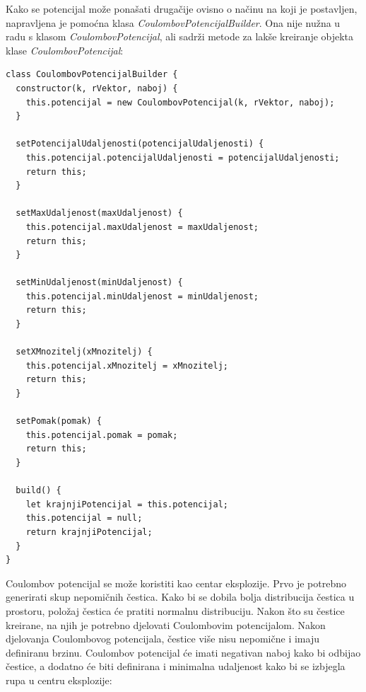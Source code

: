 \documentclass{foi}
\begin{document}
Kako se potencijal može ponašati drugačije ovisno o načinu na koji je postavljen, napravljena je pomoćna klasa \textit{CoulombovPotencijalBuilder}. Ona nije nužna u radu s klasom \textit{CoulombovPotencijal}, ali sadrži metode za lakše kreiranje objekta klase \textit{CoulombovPotencijal}:

\begin{verbatim}
class CoulombovPotencijalBuilder {
  constructor(k, rVektor, naboj) {
    this.potencijal = new CoulombovPotencijal(k, rVektor, naboj);
  }

  setPotencijalUdaljenosti(potencijalUdaljenosti) {
    this.potencijal.potencijalUdaljenosti = potencijalUdaljenosti;
    return this;
  }

  setMaxUdaljenost(maxUdaljenost) {
    this.potencijal.maxUdaljenost = maxUdaljenost;
    return this;
  }

  setMinUdaljenost(minUdaljenost) {
    this.potencijal.minUdaljenost = minUdaljenost;
    return this;
  }

  setXMnozitelj(xMnozitelj) {
    this.potencijal.xMnozitelj = xMnozitelj;
    return this;
  }

  setPomak(pomak) {
    this.potencijal.pomak = pomak;
    return this;
  }

  build() {
    let krajnjiPotencijal = this.potencijal;
    this.potencijal = null;
    return krajnjiPotencijal;
  }
}
\end{verbatim}

Coulombov potencijal se može koristiti kao centar eksplozije. Prvo je potrebno generirati skup nepomičnih čestica. Kako bi se dobila bolja distribucija čestica u prostoru, položaj čestica će pratiti normalnu distribuciju. Nakon što su čestice kreirane, na njih je potrebno djelovati Coulombovim potencijalom. Nakon djelovanja Coulombovog potencijala, čestice više nisu nepomične i imaju definiranu brzinu. Coulombov potencijal će imati negativan naboj kako bi odbijao čestice, a dodatno će biti definirana i minimalna udaljenost kako bi se izbjegla rupa u centru eksplozije:
\end{document}
